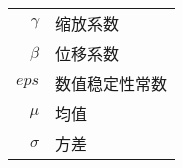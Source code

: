 
\begin{nomenclature*}
\label{chap:symb}

\begin{longtable}{rl}
  $\gamma$    & 缩放系数  \\
  $\beta$     & 位移系数  \\
  $eps$       & 数值稳定性常数  \\
  $\mu$       & 均值      \\
  $\sigma$    & 方差      \\
  

\end{longtable}

\end{nomenclature*}
